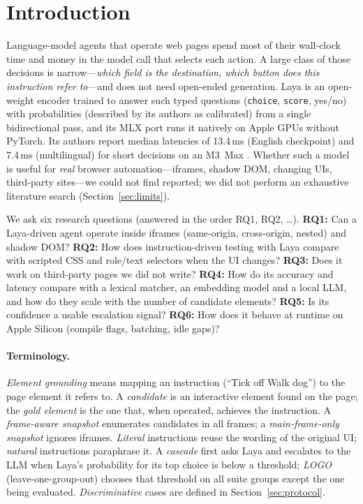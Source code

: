 \documentclass[11pt,a4paper]{article}
\begin{document}
\section{Introduction}
Language-model agents that operate web pages spend most of their wall-clock time and money in the model call that selects each action. A large class of those decisions is narrow---\emph{which field is the destination, which button does this instruction refer to}---and does not need open-ended generation. Laya \cite{laya} is an open-weight encoder trained to answer such typed questions (\texttt{choice}, \texttt{score}, yes/no) with probabilities (described by its authors as calibrated) from a single bidirectional pass, and its MLX port \cite{lmlx} runs it natively on Apple GPUs without PyTorch. Its authors report median latencies of 13.4\,ms (English checkpoint) and 7.4\,ms (multilingual) for short decisions on an M3~Max \cite{lmlx}. Whether such a model is useful for \emph{real} browser automation---iframes, shadow DOM, changing UIs, third-party sites---we could not find reported; we did not perform an exhaustive literature search (Section~\ref{sec:limits}).

We ask six research questions (answered in the order RQ1, RQ2, \ldots). \textbf{RQ1:} Can a Laya-driven agent operate inside iframes (same-origin, cross-origin, nested) and shadow DOM? \textbf{RQ2:} How does instruction-driven testing with Laya compare with scripted CSS and role/text selectors when the UI changes? \textbf{RQ3:} Does it work on third-party pages we did not write? \textbf{RQ4:} How do its accuracy and latency compare with a lexical matcher, an embedding model and a local LLM, and how do they scale with the number of candidate elements? \textbf{RQ5:} Is its confidence a usable escalation signal? \textbf{RQ6:} How does it behave at runtime on Apple Silicon (compile flags, batching, idle gaps)?

\paragraph{Terminology.} \emph{Element grounding} means mapping an instruction (``Tick off Walk dog'') to the page element it refers to. A \emph{candidate} is an interactive element found on the page; the \emph{gold element} is the one that, when operated, achieves the instruction. A \emph{frame-aware snapshot} enumerates candidates in all frames; a \emph{main-frame-only snapshot} ignores iframes. \emph{Literal} instructions reuse the wording of the original UI; \emph{natural} instructions paraphrase it. A \emph{cascade} first asks Laya and escalates to the LLM when Laya's probability for its top choice is below a threshold; \emph{LOGO} (leave-one-group-out) chooses that threshold on all suite groups except the one being evaluated. \emph{Discriminative} cases are defined in Section~\ref{sec:protocol}.
\end{document}
